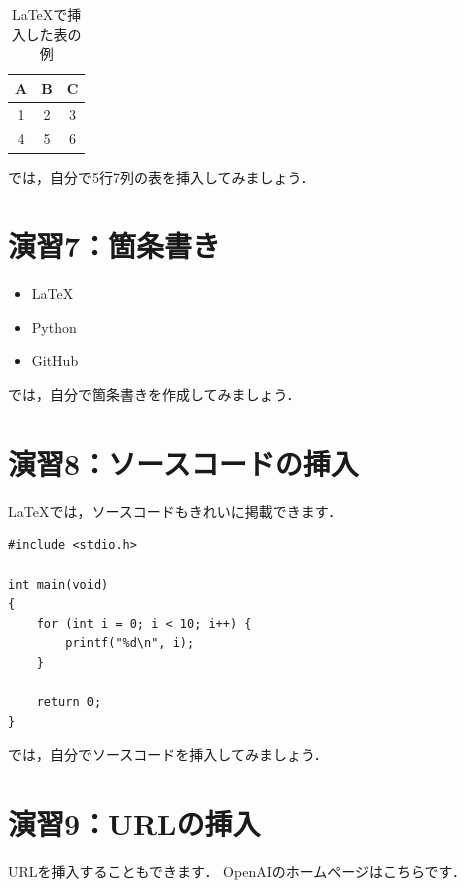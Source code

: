 \documentclass[a4paper,twocolumn]{jsarticle}
\begin{document}
\begin{table}[H]
    \centering
    \begin{tabular}{|c|c|c|}
        \hline
        A & B & C \\
        \hline
        1 & 2 & 3 \\
        4 & 5 & 6 \\
        \hline
    \end{tabular}
    \caption{LaTeXで挿入した表の例}
    \label{tab:practice}
\end{table}

では，自分で5行7列の表を挿入してみましょう．


\section*{演習7：箇条書き}
\begin{itemize}
    \item LaTeX
    \item Python
    \item GitHub
\end{itemize}

では，自分で箇条書きを作成してみましょう．


\section*{演習8：ソースコードの挿入}
LaTeXでは，ソースコードもきれいに掲載できます．

\begin{lstlisting}
#include <stdio.h>

int main(void)
{
    for (int i = 0; i < 10; i++) {
        printf("%d\n", i);
    }

    return 0;
}
\end{lstlisting}

では，自分でソースコードを挿入してみましょう．


\section*{演習9：URLの挿入}
URLを挿入することもできます．
OpenAIのホームページはこちらです．
\end{document}
